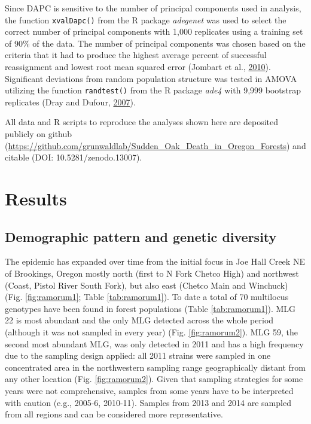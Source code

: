 \documentclass[double,12pt]{beavtex}
\begin{document}
  Since DAPC is sensitive to the number of principal components used in
  analysis, the function \texttt{xvalDapc()} from the R package
  \emph{adegenet} was used to select the correct number of principal
  components with 1,000 replicates using a training set of 90\% of the
  data. The number of principal components was chosen based on the
  criteria that it had to produce the highest average percent of
  successful reassignment and lowest root mean squared error (Jombart et
  al., \protect\hyperlink{ref-jombart2010discriminant}{2010}). Significant
  deviations from random population structure was tested in AMOVA
  utilizing the function \texttt{randtest()} from the R package
  \emph{ade4} with 9,999 bootstrap replicates (Dray and Dufour,
  \protect\hyperlink{ref-dray2007ade4}{2007}).
  
  All data and R scripts to reproduce the analyses shown here are
  deposited publicly on github
  (\url{https://github.com/grunwaldlab/Sudden_Oak_Death_in_Oregon_Forests})
  and citable (DOI: 10.5281/zenodo.13007).
  
  \section{Results}\label{results}
  
  \subsection{Demographic pattern and genetic
  diversity}\label{demographic-pattern-and-genetic-diversity}
  
  The epidemic has expanded over time from the initial focus in Joe Hall
  Creek NE of Brookings, Oregon mostly north (first to N Fork Chetco High)
  and northwest (Coast, Pistol River South Fork), but also east (Chetco
  Main and Winchuck) (Fig. \ref{fig:ramorum1}; Table \ref{tab:ramorum1}).
  To date a total of 70 multilocus genotypes have been found in forest
  populations (Table \ref{tab:ramorum1}). MLG 22 is most abundant and the
  only MLG detected across the whole period (although it was not sampled
  in every year) (Fig. \ref{fig:ramorum2}). MLG 59, the second most
  abundant MLG, was only detected in 2011 and has a high frequency due to
  the sampling design applied: all 2011 strains were sampled in one
  concentrated area in the northwestern sampling range geographically
  distant from any other location (Fig. \ref{fig:ramorum2}). Given that
  sampling strategies for some years were not comprehensive, samples from
  some years have to be interpreted with caution (e.g., 2005-6, 2010-11).
  Samples from 2013 and 2014 are sampled from all regions and can be
  considered more representative.
  
\end{document}
